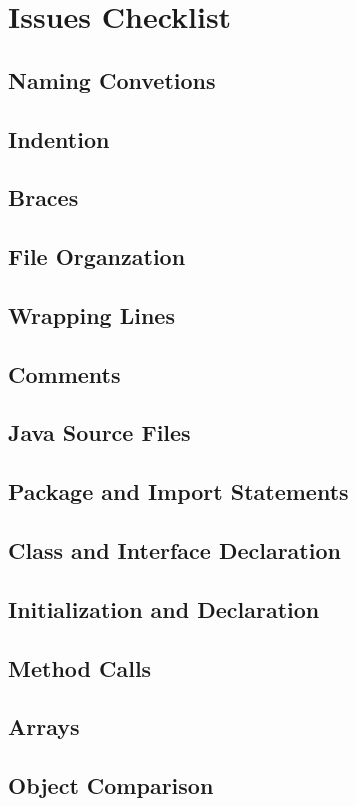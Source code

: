 \section{Issues Checklist}
\subsection{Naming Convetions}
\subsection{Indention}
\subsection{Braces}
\subsection{File Organzation}
\subsection{Wrapping Lines}
\subsection{Comments}
\subsection{Java Source Files}
\subsection{Package and Import Statements}
\subsection{Class and Interface Declaration}
\subsection{Initialization and Declaration}
\subsection{Method Calls}
\subsection{Arrays}
\subsection{Object Comparison}
